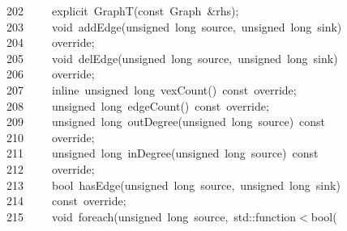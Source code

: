 \documentclass{ctexart}
\newcommand{\hlstd}[1]{\textcolor[rgb]{0.2,0.2,0.2}{#1}}
\newcommand{\hlopt}[1]{\textcolor[rgb]{0.2,0.2,0.2}{#1}}
\newcommand{\hllin}[1]{\textcolor[rgb]{0.59,0.59,0.59}{#1}}
\newcommand{\hlkwb}[1]{\textcolor[rgb]{0.63,0,0.31}{#1}}
\newcommand{\hlkwc}[1]{\textcolor[rgb]{0,0.63,0.31}{#1}}
\newcommand{\hlkwd}[1]{\textcolor[rgb]{0.78,0.23,0.41}{#1}}
\begin{document}
\hllin{202\ }\hlstd{}\hlstd{\ \ \ \ }\hlstd{}\hlkwc{explicit\ }\hlstd{}\hlkwd{GraphT}\hlstd{}\hlopt{(}\hlstd{}\hlkwb{const\ }\hlstd{Graph\ }\hlopt{\&}\hlstd{rhs}\hlopt{);}\\
\hllin{203\ }\hlstd{}\hlstd{\ \ \ \ }\hlstd{}\hlkwb{void\ }\hlstd{}\hlkwd{addEdge}\hlstd{}\hlopt{(}\hlstd{}\hlkwb{unsigned\ long\ }\hlstd{source}\hlopt{,\ }\hlstd{}\hlkwb{unsigned\ long\ }\hlstd{sink}\hlopt{)\ }\Righttorque\\
\hllin{204\ }\hlstd{}\hlstd{\ \ \ \ }\hlstd{override}\hlopt{;}\\
\hllin{205\ }\hlstd{}\hlstd{\ \ \ \ }\hlstd{}\hlkwb{void\ }\hlstd{}\hlkwd{delEdge}\hlstd{}\hlopt{(}\hlstd{}\hlkwb{unsigned\ long\ }\hlstd{source}\hlopt{,\ }\hlstd{}\hlkwb{unsigned\ long\ }\hlstd{sink}\hlopt{)\ }\Righttorque\\
\hllin{206\ }\hlstd{}\hlstd{\ \ \ \ }\hlstd{override}\hlopt{;}\\
\hllin{207\ }\hlstd{}\hlstd{\ \ \ \ }\hlstd{}\hlkwc{inline\ }\hlstd{}\hlkwb{unsigned\ long\ }\hlstd{}\hlkwd{vexCount}\hlstd{}\hlopt{()\ }\hlstd{}\hlkwb{const\ }\hlstd{override}\hlopt{;}\\
\hllin{208\ }\hlstd{}\hlstd{\ \ \ \ }\hlstd{}\hlkwb{unsigned\ long\ }\hlstd{}\hlkwd{edgeCount}\hlstd{}\hlopt{()\ }\hlstd{}\hlkwb{const\ }\hlstd{override}\hlopt{;}\\
\hllin{209\ }\hlstd{}\hlstd{\ \ \ \ }\hlstd{}\hlkwb{unsigned\ long\ }\hlstd{}\hlkwd{outDegree}\hlstd{}\hlopt{(}\hlstd{}\hlkwb{unsigned\ long\ }\hlstd{source}\hlopt{)\ }\hlstd{}\hlkwb{const\ }\Righttorque\\
\hllin{210\ }\hlstd{}\hlstd{\ \ \ \ }\hlstd{override}\hlopt{;}\\
\hllin{211\ }\hlstd{}\hlstd{\ \ \ \ }\hlstd{}\hlkwb{unsigned\ long\ }\hlstd{}\hlkwd{inDegree}\hlstd{}\hlopt{(}\hlstd{}\hlkwb{unsigned\ long\ }\hlstd{source}\hlopt{)\ }\hlstd{}\hlkwb{const\ }\Righttorque\\
\hllin{212\ }\hlstd{}\hlstd{\ \ \ \ }\hlstd{override}\hlopt{;}\\
\hllin{213\ }\hlstd{}\hlstd{\ \ \ \ }\hlstd{}\hlkwb{bool\ }\hlstd{}\hlkwd{hasEdge}\hlstd{}\hlopt{(}\hlstd{}\hlkwb{unsigned\ long\ }\hlstd{source}\hlopt{,\ }\hlstd{}\hlkwb{unsigned\ long\ }\hlstd{sink}\hlopt{)\ }\Righttorque\\
\hllin{214\ }\hlstd{}\hlstd{\ \ \ \ }\hlstd{}\hlkwb{const\ }\hlstd{override}\hlopt{;}\\
\hllin{215\ }\hlstd{}\hlstd{\ \ \ \ }\hlstd{}\hlkwb{void\ }\hlstd{}\hlkwd{foreach}\hlstd{}\hlopt{(}\hlstd{}\hlkwb{unsigned\ long\ }\hlstd{source}\hlopt{,\ }\hlstd{}\hlkwc{std}\hlstd{}\hlopt{::}\hlstd{function}\hlopt{$<$}\hlstd{}\hlkwb{bool}\hlstd{}\hlopt{(}\Righttorque\\
\end{document}
